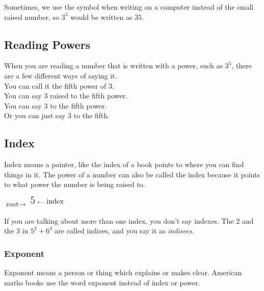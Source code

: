 \documentclass{article}
\begin{document}
\begin{spacing}{1.25}
Sometimes, we use the {\fontsize{30}{30}\selectfont {\string^}} symbol when writing on a computer instead of the small raised number, so $3^5$ would be written as 3{\fontsize{30}{34}\selectfont {\string^}}5.

\pagebreak

\subsection*{Reading Powers}

When you are reading a number that is written with a power, such as $3^5$, there are a few different ways of saying it.\\

You can call it the fifth power of 3.\\

You can say 3 raised to the fifth power.\\

You can say 3 to the fifth power.\\

Or you can just say 3 to the fifth.

\pagebreak

\subsection*{Index}

Index means a pointer, like the index of a book points to where you can find things in it. The power of a number can also be called the index because it points to what power the number is being raised to.

\begin{center}
$\text{root}\rightarrow$
{\fontsize{30}{34}}
$\textsuperscript{{\fontsize{15}{20}\selectfont 5} $\longleftarrow$}\textsuperscript{\normalsize{\text{index}}}$
\normalsize
\end{center}

If you are talking about more than one index, you don’t say indexes. The 2 and the 3 in $5^2+6^3$ are called indices, and you say it as \textit{indisees.}

\subsubsection*{Exponent}

Exponent means a person or thing which explains or makes clear. American maths books use the word exponent instead of index or power.


\end{spacing}
\end{document}
